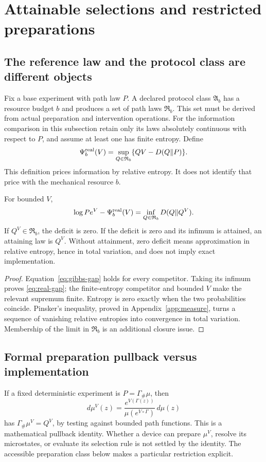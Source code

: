 \section{Attainable selections and restricted preparations}\label{sec:realizability}
\subsection{The reference law and the protocol class are different objects}
Fix a base experiment with path law $P$. A declared protocol class $\mathfrak A_b$ has a resource budget $b$ and produces a set of path laws $\mathfrak R_b$. This set must be derived from actual preparation and intervention operations. For the information comparison in this subsection retain only its laws absolutely continuous with respect to $P$, and assume at least one has finite entropy. Define
\[
 \Psi_b^{\rm real}(V)=\sup_{Q\in\mathfrak R_b}\{QV-D(Q\Vert P)\}.
\]
This definition prices information by relative entropy. It does not identify that price with the mechanical resource $b$.

\begin{theorem}\label{thm:real-gap}
For bounded $V$,
\begin{equation}
 \log Pe^V-\Psi_b^{\rm real}(V)
 =\inf_{Q\in\mathfrak R_b}D(Q\Vert Q^V).
 \label{eq:real-gap}
\end{equation}
If $Q^V\in\mathfrak R_b$, the deficit is zero. If the deficit is zero and its infimum is attained, an attaining law is $Q^V$. Without attainment, zero deficit means approximation in relative entropy, hence in total variation, and does not imply exact implementation.
\end{theorem}
\begin{proof}
Equation~\eqref{eq:gibbs-gap} holds for every competitor. Taking its infimum proves \eqref{eq:real-gap}; the finite-entropy competitor and bounded $V$ make the relevant supremum finite. Entropy is zero exactly when the two probabilities coincide. Pinsker's inequality, proved in Appendix~\ref{app:measure}, turns a sequence of vanishing relative entropies into convergence in total variation. Membership of the limit in $\mathfrak R_b$ is an additional closure issue.
\end{proof}

\subsection{Formal preparation pullback versus implementation}
If a fixed deterministic experiment is $P=\Gamma_\#\mu$, then
\[
 d\mu^V(z)=\frac{e^{V(\Gamma(z))}}{\mu(e^{V\circ\Gamma})}\,d\mu(z)
\]
has $\Gamma_\#\mu^V=Q^V$, by testing against bounded path functions. This is a mathematical pullback identity. Whether a device can prepare $\mu^V$, resolve its microstates, or evaluate its selection rule is not settled by the identity. The accessible preparation class below makes a particular restriction explicit.

